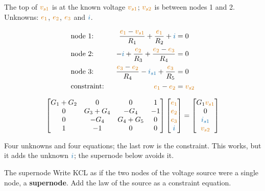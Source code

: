 \documentclass[11pt,a4paper]{article}
\newcommand{\Icol}[1]{\textcolor{ccur}{#1}}
\newcommand{\Vcol}[1]{\textcolor{cvolt}{#1}}
\newcommand{\e}[1]{\textcolor{cvolt}{e_{#1}}}
\newcommand{\nodev}[3]{\fill (#1) circle (1.7pt) node[#2, inner sep=2pt, font=\small, text=cvolt] {#3};}
\newcommand{\gnd}[1]{\draw (#1,0) -- (#1,-0.2) node[ground] {};}
\newcommand{\exB}[1]{%
  \draw (0,0) to[american voltage source, invert, l=$\Vcol{v_{s1}}$] (0,2);
  \draw (0,2) to[R, l=$R_1$] (1.8,2) to[american voltage source, l=$\Vcol{v_{s2}}$] (3.6,2)
        to[R, l=$R_4$] (5.4,2) -- (7.0,2);
  \draw (1.8,2) to[R, l=$R_2$] (1.8,0);
  \draw (3.6,2) to[R, l=$R_3$] (3.6,0);
  \draw (5.4,0) to[american current source, l_=$\Icol{i_{s1}}$] (5.4,2);
  \draw (7.0,2) to[R, l=$R_5$] (7.0,0);
  \draw (0,0) -- (7.0,0);
  \nodev{1.8,2}{above right}{$e_1$}
  \nodev{3.6,2}{above left}{$e_2$}
  \nodev{5.4,2}{above}{$e_3$}
  \ifnum#1=1
    \draw[iar] (2.55,1.5) -- (3.05,1.5);
    \node[font=\small, text=ccur] at (2.8,1.25) {$i$};
  \fi
  \ifnum#1=2
    \draw[dashed, metured, thick, rounded corners=4pt] (1.5,1.6) rectangle (3.9,2.95);
    \node[font=\scriptsize, text=metured, anchor=south] at (2.7,2.95) {supernode};
  \fi
  \gnd{1.8}}
\begin{document}
\begin{examplebox}
{\centering
{}\par}
The top of $\Vcol{v_{s1}}$ is at the known voltage $\Vcol{v_{s1}}$; $\Vcol{v_{s2}}$ is between
nodes 1 and 2. Unknowns: $\e{1}$, $\e{2}$, $\e{3}$ and $\Icol{i}$.

\begin{minipage}[c]{0.43\linewidth}
\begin{alignat*}{2}
  &\text{node 1:}\ \ & \frac{\e{1} - \Vcol{v_{s1}}}{R_1} + \frac{\e{1}}{R_2} + \Icol{i} &= 0\\
  &\text{node 2:}\ \ & -\Icol{i} + \frac{\e{2}}{R_3} + \frac{\e{2} - \e{3}}{R_4} &= 0\\
  &\text{node 3:}\ \ & \frac{\e{3} - \e{2}}{R_4} - \Icol{i_{s1}} + \frac{\e{3}}{R_5} &= 0\\
  &\text{constraint:}\ \ & \e{1} - \e{2} &= \Vcol{v_{s2}}
\end{alignat*}
\end{minipage}\hfill
\begin{minipage}[c]{0.55\linewidth}
\small
\[
  \begin{bmatrix}
    G_1 + G_2 & 0 & 0 & 1\\
    0 & G_3 + G_4 & -G_4 & -1\\
    0 & -G_4 & G_4 + G_5 & 0\\
    1 & -1 & 0 & 0
  \end{bmatrix}
  \begin{bmatrix} \e{1}\\ \e{2}\\ \e{3}\\ \Icol{i} \end{bmatrix}
  =
  \begin{bmatrix} G_1\Vcol{v_{s1}}\\ 0\\ \Icol{i_{s1}}\\ \Vcol{v_{s2}} \end{bmatrix}
\]
\end{minipage}

\smallskip
Four unknowns and four equations; the last row is the constraint. This works, but it adds the
unknown $\Icol{i}$; the supernode below avoids it.

\end{examplebox}

\begin{definitionbox}{The supernode}
Write KCL as if the two nodes of the voltage source were a single node, a
\textbf{supernode}. Add the law of the source as a constraint equation.
\end{definitionbox}
\end{document}
